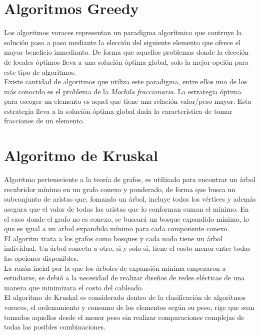 \section*{Algoritmos Greedy}
    Los algoritmos voraces representan un paradigma algorítmico que contruye la solución paso a paso mediante la elección del siguiente elemento que ofrece el mayor beneficio inmedianto. De forma que aquellos problemas donde la elección de locales óptimos lleva a una solución óptima global, solo la mejor opción para este tipo de algoritmos.\\
    
    Existe cantidad de algoritmos que utiliza este paradigma, entre ellos uno de los más conocido es el problema de la \textit{Mochila fraccionaria}. La estrategia óptima para escoger un elemento es aquel que tiene una relación valor/peso mayor. Esta estrategia lleva a la solución óptima global dada la característica de tomar fracciones de un elemento.

\section*{Algoritmo de Kruskal}
    Algoritmo perteneciente a la teoría de grafos, es utilizado para encontrar un árbol recubridor mínimo en un grafo conexo y ponderado, de forma que busca un subconjunto de aristas que, fomando un árbol, incluye todos los vértices y además asegura que el valor de todas las aristas que lo conforman suman el mínimo. En el caso donde el grafo no es conexo, se buscará un bosque expandido mínimo, lo que es igual a un arbol expandido mínimo para cada componente conexo.\\
    
    El algoritm trata a los grafos como bosques y cada nodo tiene un árbol individual. Un árbol conecta a otro, si y solo si, tiene el costo menor entre todas las opciones disponibles.\\
    
    La razón incial por la que los árboles de expansión mínima empezaron a estudiarse, se debió a la necesidad de realizar diseños de redes elécticas de una manera que minimizara el costo del cableado.\\
    
    El algoritmo de Kruskal es considerado dentro de la clasificación de algoritmos voraces, el ordenamiento y consumo de los elementos según su peso, rige que sean tomados aquellos desde el menor peso sin realizar comparaciones complejas de todas las posibles combinaciones.\\
    
